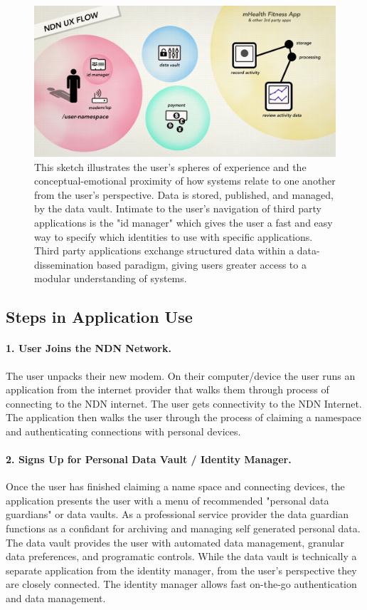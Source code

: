 \begin{figure}
\begin{center}
\includegraphics[width=.5\textwidth]{figures/ux-scenario}
\caption{This sketch illustrates the user's spheres of experience and the conceptual-emotional proximity of how systems relate to one another from the user's perspective. Data is stored, published, and managed, by the data vault. Intimate to the user's navigation of third party applications is the "id manager" which gives the user a fast and easy way to specify which identities to use with specific applications. Third party applications exchange structured data within a data-dissemination based paradigm, giving users greater access to a modular understanding of systems.}
\label{fig:uxsketch}
\end{center}
\end{figure}

\subsection{Steps in Application Use} 

\paragraph*{1. User Joins the NDN Network.} 
The user unpacks their new modem. On their computer/device the user runs an application from the internet provider that walks them through process of connecting to the NDN internet. The user gets connectivity to the NDN Internet. The application then walks the user through the process of claiming a namespace and authenticating connections with personal devices. 
   
\paragraph*{2. Signs Up for Personal Data Vault / Identity Manager.}
Once the user has finished claiming a name space and connecting devices, the application presents the user with a menu of recommended "personal data guardians" or data vaults. As a professional service provider the data guardian functions as a confidant for archiving and managing self generated personal data. The data vault provides the user with automated data management, granular data preferences, and programatic controls. While the data vault is technically a separate application from the identity manager, from the user's perspective they are closely connected. The identity manager allows fast on-the-go authentication and data management. 

